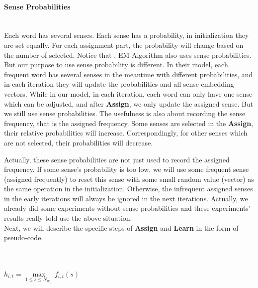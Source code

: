 \paragraph{Sense Probabilities}\ \\
Each word has several senses. Each sense has a probability, in initialization they are set equally. For each assignment part, the probability will change based on the number of selected. Notice that , EM-Algorithm also uses sense probabilities. But our purpose to use sense probability is different. In their model, each frequent word has several senses in the meantime  with different probabilities, and in each iteration they will update the probabilities and all sense embedding vectors. While in our model, in each iteration, each word can only have one sense which can be adjusted, and after \textbf{Assign}, we only update the assigned sense. But we still use sense probabilities. The usefulness is also about recording the sense frequency, that is the assigned frequency. Some senses are selected in the \textbf{Assign}, their relative probabilities will increase. Correspondingly, for other senses which are not selected, their probabilities will decrease. 

Actually, these sense probabilities are not just used to record the assigned frequency. If some sense's probability is too low, we will use some frequent sense (assigned frequently) to reset this sense with some small random value (vector) as the same operation in the initialization. Otherwise, the infrequent assigned senses in the early iterations will always be ignored in the next iterations. Actually, we already did some experiments without sense probabilities and these experiments' results really told use the above situation. \\


Next, we will describe the specific steps of \textbf{Assign} and \textbf{Learn} in the form of pseudo-code.

\subparagraph{}\

\begin{algorithmic}
	 
  \Repeat 
   
\State $h_{i,t} = \max\limits_{1\leq s\leq N_{w_{i,t}}} f_{i,t}(s)$ 
  \EndFor
	\EndFor
\EndProcedure
	
\end{algorithmic}

\subparagraph{}\

